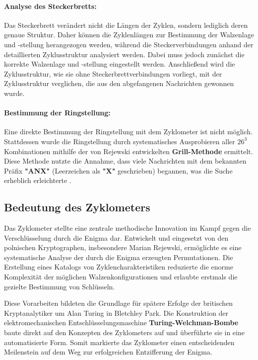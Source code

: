\documentclass[12pt, ngerman, a4paper, numbers=noenddot]{article}
\begin{document}
\paragraph{Analyse des Steckerbretts:}

Das Steckerbrett verändert nicht die Längen der Zyklen, sondern lediglich deren genaue Struktur. Daher können die Zyklenlängen zur Bestimmung der Walzenlage und -stellung herangezogen werden, während die Steckerverbindungen anhand der detaillierten Zyklusstruktur analysiert werden. Dabei muss jedoch zunächst die korrekte Walzenlage und -stellung eingestellt werden. Anschließend wird die Zyklusstruktur, wie sie ohne Steckerbrettverbindungen vorliegt, mit der Zyklusstruktur verglichen, die aus den abgefangenen Nachrichten gewonnen wurde.

\paragraph{Bestimmung der Ringstellung:}

Eine direkte Bestimmung der Ringstellung mit dem Zyklometer ist nicht möglich. Stattdessen wurde die Ringstellung durch systematisches Ausprobieren aller $26^3$ Kombinationen mithilfe der von Rejewski entwickelten \textbf{Grill-Methode} ermittelt. Diese Methode nutzte die Annahme, dass viele Nachrichten mit dem bekannten Präfix \textbf{"ANX"} (Leerzeichen als  \textbf{"X"} geschrieben) begannen, was die Suche erheblich erleichterte \autocite{rejewski1981enigma}.



\subsection{Bedeutung des Zyklometers}

Das Zyklometer stellte eine zentrale methodische Innovation im Kampf gegen die Verschlüsselung durch die Enigma dar. Entwickelt und eingesetzt von den polnischen Kryptographen, insbesondere Marian Rejewski, ermöglichte es eine systematische Analyse der durch die Enigma erzeugten Permutationen. Die Erstellung eines Katalogs von Zyklencharakteristiken reduzierte die enorme Komplexität der möglichen Walzenkonfigurationen und erlaubte erstmals die gezielte Bestimmung von Schlüsseln.

Diese Vorarbeiten bildeten die Grundlage für spätere Erfolge der britischen Kryptanalytiker um Alan Turing in Bletchley Park. Die Konstruktion der elektromechanischen Entschlüsselungsmaschine \textbf{Turing-Welchman-Bombe} baute direkt auf den Konzepten des Zyklometers auf und überführte sie in eine automatisierte Form. Somit markierte das Zyklometer einen entscheidenden Meilenstein auf dem Weg zur erfolgreichen Entzifferung der Enigma.
\end{document}
